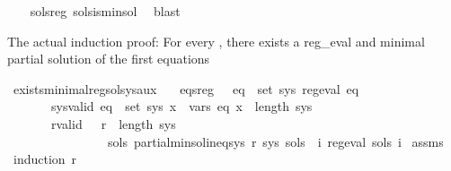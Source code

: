 \begin{isabellebody}
%
\isadelimproof
\ \ %
\endisadelimproof
%
\isatagproof
{}\isamarkupfalse%
\ sols{\isacharprime}{\kern0pt}{\isacharunderscore}{\kern0pt}reg\ sols{\isacharprime}{\kern0pt}{\isacharunderscore}{\kern0pt}is{\isacharunderscore}{\kern0pt}min{\isacharunderscore}{\kern0pt}sol\ \isamarkupfalse%
\ blast%
\endisatagproof
{\isafoldproof}%
%
\isadelimproof
\isanewline
%
\endisadelimproof
\isanewline
{}\isamarkupfalse%
%
\begin{isamarkuptext}%
The actual induction proof: For every , there exists a reg_eval and minimal partial
solution of the first  equations%
\end{isamarkuptext}\isamarkuptrue%
\isamarkupfalse%
\ exists{\isacharunderscore}{\kern0pt}minimal{\isacharunderscore}{\kern0pt}reg{\isacharunderscore}{\kern0pt}sol{\isacharunderscore}{\kern0pt}sys{\isacharunderscore}{\kern0pt}aux{\isacharcolon}{\kern0pt}\isanewline
\ \ \ eqs{\isacharunderscore}{\kern0pt}reg{\isacharcolon}{\kern0pt}\ \ \ {\isachardoublequoteopen}{\isasymforall}eq\ {\isasymin}\ set\ sys{\isachardot}{\kern0pt}\ reg{\isacharunderscore}{\kern0pt}eval\ eq{\isachardoublequoteclose}\isanewline
\ \ \ \ \ \ \ sys{\isacharunderscore}{\kern0pt}valid{\isacharcolon}{\kern0pt}\ {\isachardoublequoteopen}{\isasymforall}eq\ {\isasymin}\ set\ sys{\isachardot}{\kern0pt}\ {\isasymforall}x\ {\isasymin}\ vars\ eq{\isachardot}{\kern0pt}\ x\ {\isacharless}{\kern0pt}\ length\ sys{\isachardoublequoteclose}\isanewline
\ \ \ \ \ \ \ r{\isacharunderscore}{\kern0pt}valid{\isacharcolon}{\kern0pt}\ \ \ {\isachardoublequoteopen}r\ {\isasymle}\ length\ sys{\isachardoublequoteclose}\ \ \ \isanewline
\ \ \ \ \ \ \ \ \ \ \ \ \ \ \ \ {\isachardoublequoteopen}{\isasymexists}sols{\isachardot}{\kern0pt}\ partial{\isacharunderscore}{\kern0pt}min{\isacharunderscore}{\kern0pt}sol{\isacharunderscore}{\kern0pt}ineq{\isacharunderscore}{\kern0pt}sys\ r\ sys\ sols\ {\isasymand}\ {\isacharparenleft}{\kern0pt}{\isasymforall}i{\isachardot}{\kern0pt}\ reg{\isacharunderscore}{\kern0pt}eval\ {\isacharparenleft}{\kern0pt}sols\ i{\isacharparenright}{\kern0pt}{\isacharparenright}{\kern0pt}{\isachardoublequoteclose}\isanewline
%
\isadelimproof
%
\endisadelimproof
%
\isatagproof
{}\isamarkupfalse%
\ assms\ \isamarkupfalse%
\ {\isacharparenleft}{\kern0pt}induction\ r{\isacharparenright}{\kern0pt}\isanewline
\ \ \isamarkupfalse%
\ {}\isanewline

\end{isabellebody}

